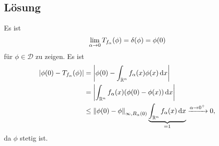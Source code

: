 \documentclass{exercise}
\begin{document}
    \subsection*{Lösung}
    Es ist
    \[
        \lim_{\alpha \to 0}T_{f_\alpha}\parentheses*{\phi} = \delta\parentheses*{\phi} = \phi\parentheses*{0}
    \]
    für \(\phi \in \mathcal{D}\) zu zeigen.
    Es ist
    \begin{align*}
        \absolute*{\phi\parentheses*{0} - T_{f_\alpha}\parentheses*{\phi}} &= \absolute*{\phi\parentheses*{0} - \int_{\R^n}f_\alpha\parentheses*{x}\phi\parentheses*{x}\d x}\\
        &= \absolute*{\int_{\R^n}f_\alpha\parentheses*{x}\parentheses*{\phi\parentheses*{0} - \phi\parentheses*{x}}\d x}\\
        &\le \norm*{\phi\parentheses*{0} - \phi}_{\infty, B_\alpha\parentheses*{0}}\underbrace{\int_{\R^n}f_\alpha\parentheses*{x}\d x}_{= 1} \xrightarrow{\alpha \to 0^+} 0,
    \end{align*}
    da \(\phi\) stetig ist.
\end{document}
